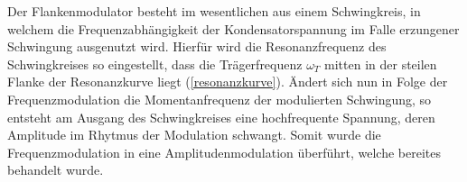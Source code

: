 Der Flankenmodulator besteht im wesentlichen aus einem Schwingkreis, in welchem die Frequenzabhängigkeit der Kondensatorspannung im Falle erzungener Schwingung ausgenutzt wird. Hierfür wird die Resonanzfrequenz des Schwingkreises so eingestellt, dass die Trägerfrequenz $\omega_T$ mitten in der steilen Flanke der Resonanzkurve liegt (\autoref{resonanzkurve}). Ändert sich nun in Folge der Frequenzmodulation die Momentanfrequenz der modulierten Schwingung, so entsteht am Ausgang des Schwingkreises eine hochfrequente Spannung, deren Amplitude im Rhytmus der Modulation schwangt. Somit wurde die Frequenzmodulation in eine Amplitudenmodulation überführt, welche bereites behandelt wurde.
